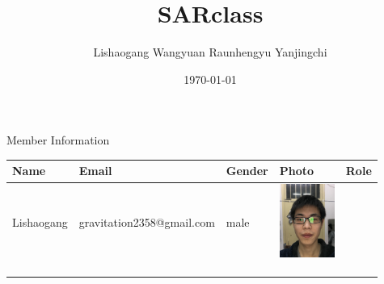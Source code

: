 \documentclass[24pt]{article}%
\title{SARclass}
\author{Lishaogang Wangyuan Raunhengyu Yanjingchi}
\date{\today}
\begin{document}
	
	\maketitle
	
	\title{}  Member Information
	
	\begin{table}[h]
		\begin{center}  
			\begin{tabular}{|l|l|l|l|l|}  
				\hline  
				Name & Email & Gender & Photo & Role \\ \hline  
				Lishaogang& gravitation2358@gmail.com & male & \includegraphics[width=18mm, height=24mm]{lishaogang.jpg} & \\ 
				&&&&\\ \hline
				&&&&\\ \hline
				&&&&\\ \hline
			
			\end{tabular}  
		\end{center}  
	\end{table}  

	
	
	
	
\end{document}
